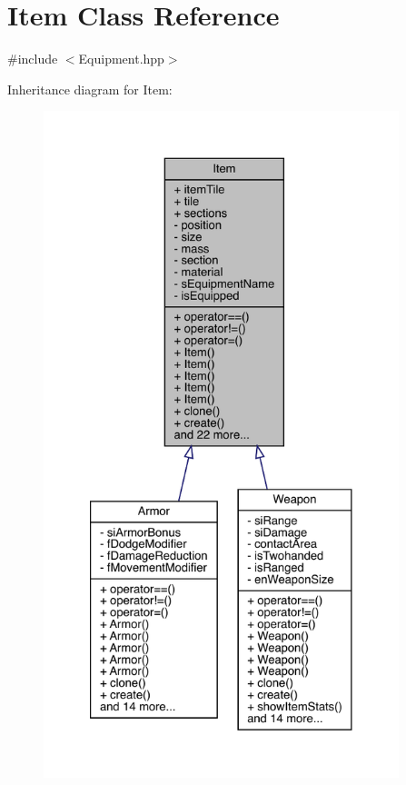 \hypertarget{class_item}{}\section{Item Class Reference}
\label{class_item}


{\ttfamily \#include $<$Equipment.\+hpp$>$}



Inheritance diagram for Item\+:
\nopagebreak
\begin{figure}[H]
\begin{center}
\leavevmode
\includegraphics[height=550pt]{dc/dc7/class_item__inherit__graph}
\end{center}
\end{figure}


